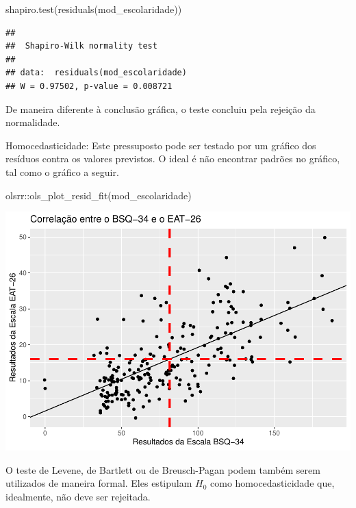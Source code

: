 \documentclass[
]{book}
\newenvironment{Shaded}{\begin{snugshade}}{\end{snugshade}}
\newcommand{\FunctionTok}[1]{\textcolor[rgb]{0.00,0.00,0.00}{#1}}
\newcommand{\NormalTok}[1]{#1}
\newcommand{\SpecialCharTok}[1]{\textcolor[rgb]{0.00,0.00,0.00}{#1}}
\begin{document}
\begin{Shaded}
\begin{Highlighting}[]
\FunctionTok{shapiro.test}\NormalTok{(}\FunctionTok{residuals}\NormalTok{(mod\_escolaridade))}
\end{Highlighting}
\end{Shaded}

\begin{verbatim}
## 
##  Shapiro-Wilk normality test
## 
## data:  residuals(mod_escolaridade)
## W = 0.97502, p-value = 0.008721
\end{verbatim}

De maneira diferente à conclusão gráfica, o teste concluiu pela rejeição da normalidade.

Homocedasticidade: Este pressuposto pode ser testado por um gráfico dos resíduos contra os valores previstos. O ideal é não encontrar padrões no gráfico, tal como o gráfico a seguir.

\begin{Shaded}
\begin{Highlighting}[]
\NormalTok{olsrr}\SpecialCharTok{::}\FunctionTok{ols\_plot\_resid\_fit}\NormalTok{(mod\_escolaridade)}
\end{Highlighting}
\end{Shaded}

\begin{center}\includegraphics{gitbook-demo_files/figure-latex/unnamed-chunk-83-1} \end{center}

O teste de Levene, de Bartlett ou de Breusch-Pagan podem também serem utilizados de maneira formal. Eles estipulam \(H_0\) como homocedasticidade que, idealmente, não deve ser rejeitada.
\end{document}
